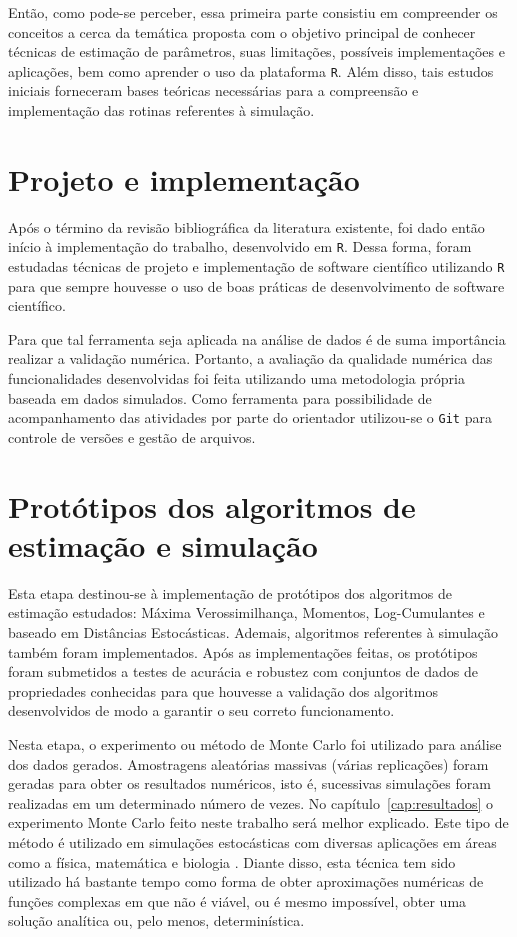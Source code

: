 Então, como pode-se perceber, essa primeira parte consistiu em compreender os conceitos a cerca da temática proposta com o objetivo principal de conhecer técnicas de estimação de parâmetros, suas limitações, possíveis implementações e aplicações, bem como aprender o uso da plataforma \texttt{R}. Além disso, tais estudos iniciais forneceram bases teóricas necessárias para a compreensão e implementação das rotinas referentes à simulação.

\section{Projeto e implementação}

Após o término da revisão bibliográfica da literatura existente, foi dado então início à implementação do trabalho, desenvolvido em \texttt{R}. Dessa forma, foram estudadas técnicas de projeto e implementação de software científico utilizando \texttt{R} para que sempre houvesse o uso de boas práticas de desenvolvimento de software científico.

Para que tal ferramenta seja aplicada na análise de dados é de suma importância realizar a validação numérica. Portanto, a avaliação da qualidade numérica das funcionalidades desenvolvidas foi feita utilizando uma metodologia própria baseada em dados simulados. Como ferramenta para possibilidade de acompanhamento das atividades por parte do orientador utilizou-se o \texttt{Git} para controle de versões e gestão de arquivos.

\section{Protótipos dos algoritmos de estimação e simulação}

Esta etapa destinou-se à implementação de protótipos dos algoritmos de estimação estudados: Máxima Verossimilhança, Momentos, Log-Cumulantes e baseado em Distâncias Estocásticas. Ademais, algoritmos referentes à simulação também foram implementados. Após as implementações feitas, os protótipos foram submetidos a testes de acurácia e robustez com conjuntos de dados de propriedades conhecidas para que houvesse a validação dos algoritmos desenvolvidos de modo a garantir o seu correto funcionamento. 

Nesta etapa, o experimento ou método de Monte Carlo foi utilizado para análise dos dados gerados. Amostragens aleatórias massivas (várias replicações) foram geradas para obter os resultados numéricos, isto é, sucessivas simulações foram realizadas em um determinado número de vezes. 
No capítulo~\ref{cap:resultados} o experimento Monte Carlo feito neste trabalho será melhor explicado. Este tipo de método é utilizado em simulações estocásticas com diversas aplicações em áreas como a física, matemática e biologia \citep{busto92}. Diante disso, esta técnica tem sido utilizado há bastante tempo como forma de obter aproximações numéricas de funções complexas em que não é viável, ou é mesmo impossível, obter uma solução analítica ou, pelo menos, determinística.

